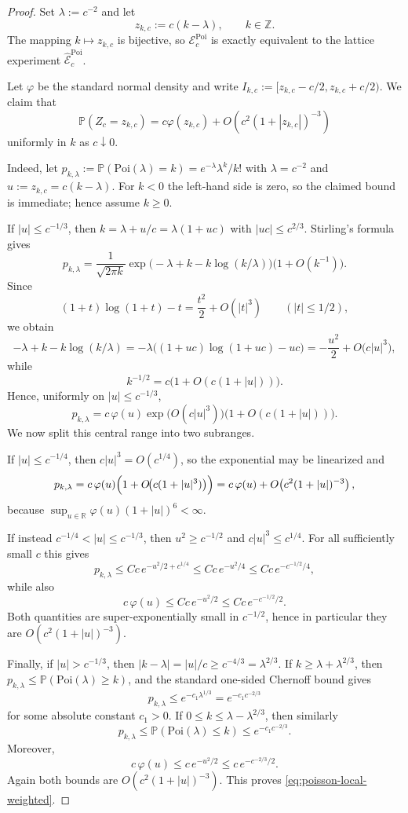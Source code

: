 \documentclass{article}
\newcommand{\Poi}{\mathrm{Poi}}
\newcommand{\Pbb}{\mathbb P}
\newcommand{\R}{\mathbb R}
\newcommand{\1}{\mathbf 1}
\begin{document}
\begin{proof}
Set $\lambda:=c^{-2}$ and let
\[
z_{k,c}:=c(k-\lambda),\qquad k\in\mathbb Z.
\]
The mapping $k\mapsto z_{k,c}$ is bijective, so $\mathcal E_c^{\mathrm{Poi}}$ is exactly equivalent to the lattice
experiment $\widehat{\mathcal E}_c^{\mathrm{Poi}}$.

Let $\varphi$ be the standard normal density and write $I_{k,c}:=[z_{k,c}-c/2,z_{k,c}+c/2)$.
We claim that
\begin{equation}
\Pbb(Z_c=z_{k,c})
=
c\varphi(z_{k,c})+O\!\left(c^2(1+|z_{k,c}|)^{-3}\right)
\label{eq:poisson-local-weighted}
\end{equation}
uniformly in $k$ as $c\downarrow 0$.

Indeed, let $p_{k,\lambda}:=\Pbb(\Poi(\lambda)=k)=e^{-\lambda}\lambda^k/k!$ with $\lambda=c^{-2}$ and
$u:=z_{k,c}=c(k-\lambda)$. For $k<0$ the left-hand side is zero, so the claimed bound is immediate; hence assume
$k\ge 0$.

If $|u|\le c^{-1/3}$, then $k=\lambda+u/c=\lambda(1+uc)$ with $|uc|\le c^{2/3}$. Stirling's formula gives
\[
p_{k,\lambda}
=
\frac{1}{\sqrt{2\pi k}}
\exp\!\bigl(-\lambda+k-k\log(k/\lambda)\bigr)\bigl(1+O(k^{-1})\bigr).
\]
Since
\[
(1+t)\log(1+t)-t=\frac{t^2}{2}+O(|t|^3)
\qquad (|t|\le 1/2),
\]
we obtain
\[
-\lambda+k-k\log(k/\lambda)
=
-\lambda\bigl((1+uc)\log(1+uc)-uc\bigr)
=
-\frac{u^2}{2}+O\!\bigl(c|u|^3\bigr),
\]
while
\[
k^{-1/2}=c\bigl(1+O(c(1+|u|))\bigr).
\]
Hence, uniformly on $|u|\le c^{-1/3}$,
\[
p_{k,\lambda}
=
c\,\varphi(u)
\exp\!\bigl(O(c|u|^3)\bigr)
\bigl(1+O(c(1+|u|))\bigr).
\]
We now split this central range into two subranges.

If $|u|\le c^{-1/4}$, then $c|u|^3=O(c^{1/4})$, so the exponential may be linearized and
\[
p_{k,\lambda}
=
c\,\varphi(u)\Bigl(1+O\!\bigl(c(1+|u|^3)\bigr)\Bigr)
=
c\,\varphi(u)+O\!\left(c^2(1+|u|)^{-3}\right),
\]
because $\sup_{u\in\R}\varphi(u)(1+|u|)^6<\infty$.

If instead $c^{-1/4}<|u|\le c^{-1/3}$, then $u^2\ge c^{-1/2}$ and $c|u|^3\le c^{1/4}$. For all sufficiently
small $c$ this gives
\[
p_{k,\lambda}\le Cc\,e^{-u^2/2+c^{1/4}}\le Cc\,e^{-u^2/4}\le Cc\,e^{-c^{-1/2}/4},
\]
while also
\[
c\,\varphi(u)\le Cc\,e^{-u^2/2}\le Cc\,e^{-c^{-1/2}/2}.
\]
Both quantities are super-exponentially small in $c^{-1/2}$, hence in particular they are
$O\!\left(c^2(1+|u|)^{-3}\right)$.

Finally, if $|u|>c^{-1/3}$, then $|k-\lambda|=|u|/c\ge c^{-4/3}=\lambda^{2/3}$. If $k\ge \lambda+\lambda^{2/3}$,
then $p_{k,\lambda}\le \Pbb(\Poi(\lambda)\ge k)$, and the standard one-sided Chernoff bound gives
\[
p_{k,\lambda}\le e^{-c_1\lambda^{1/3}}=e^{-c_1c^{-2/3}}
\]
for some absolute constant $c_1>0$. If $0\le k\le \lambda-\lambda^{2/3}$, then similarly
\[
p_{k,\lambda}\le \Pbb(\Poi(\lambda)\le k)\le e^{-c_1c^{-2/3}}.
\]
Moreover,
\[
c\,\varphi(u)\le c\,e^{-u^2/2}\le c\,e^{-c^{-2/3}/2}.
\]
Again both bounds are $O\!\left(c^2(1+|u|)^{-3}\right)$. This proves
\eqref{eq:poisson-local-weighted}.


\end{proof}
\end{document}
